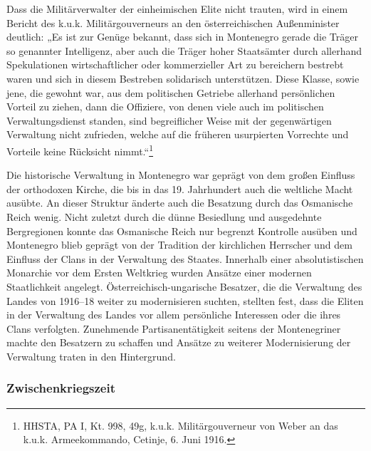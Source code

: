 Dass die Militärverwalter der einheimischen Elite nicht trauten, wird in einem Bericht des k.u.k. Militärgouverneurs an den österreichischen Außenminister deutlich: „Es ist zur Genüge bekannt, dass sich in Montenegro gerade die Träger so genannter Intelligenz, aber auch die Träger hoher Staatsämter durch allerhand Spekulationen wirtschaftlicher oder kommerzieller Art zu bereichern bestrebt waren und sich in diesem Bestreben solidarisch unterstützen. Diese Klasse, sowie jene, die gewohnt war, aus dem politischen Getriebe allerhand persönlichen Vorteil zu ziehen, dann die Offiziere, von denen viele auch im politischen Verwaltungsdienst standen, sind begreiflicher Weise mit der gegenwärtigen Verwaltung nicht zufrieden, welche auf die früheren usurpierten Vorrechte und Vorteile keine Rücksicht nimmt.“\footnote{HHSTA, PA I, Kt. 998, 49g, k.u.k. Militärgouverneur von Weber an das k.u.k. Armeekommando, Cetinje, 6. Juni 1916.} \par
Die historische Verwaltung in Montenegro war geprägt von dem großen Einfluss der orthodoxen Kirche, die bis in das 19. Jahrhundert auch die weltliche Macht ausübte. An dieser Struktur änderte auch die Besatzung durch das Osmanische Reich wenig. Nicht zuletzt durch die dünne Besiedlung und ausgedehnte Bergregionen konnte das Osmanische Reich nur begrenzt Kontrolle ausüben und Montenegro blieb geprägt von der Tradition der kirchlichen Herrscher und dem Einfluss der Clans in der Verwaltung des Staates. Innerhalb einer absolutistischen Monarchie vor dem Ersten Weltkrieg wurden Ansätze einer modernen Staatlichkeit angelegt. Österreichisch-ungarische Besatzer, die die Verwaltung des Landes von 1916–18 weiter zu modernisieren suchten, stellten fest, dass die Eliten in der Verwaltung des Landes vor allem persönliche Interessen oder die ihres Clans verfolgten. Zunehmende Partisanentätigkeit seitens der Montenegriner machte den Besatzern zu schaffen und Ansätze zu weiterer Modernisierung der Verwaltung traten in den Hintergrund.

\subsubsection{Zwischenkriegszeit}

